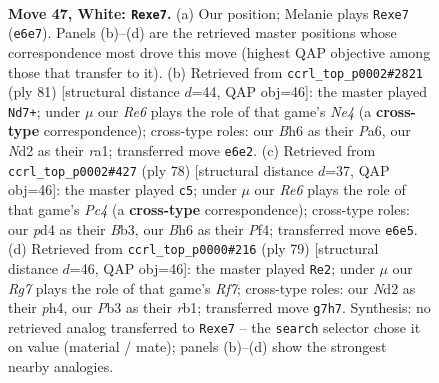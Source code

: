 \documentclass[11pt]{article}
\begin{document}
\clearpage

\begin{figure}[p]\centering
\begin{subfigure}{0.46\textwidth}\centering
\resizebox{\linewidth}{!}{%
\newchessgame
\chessboard[
  setfen={5k2/4n1R1/4R2B/8/1p1p2P1/pP6/P1PN3K/8 w - - 1 47},
  showmover=false,
  pgfstyle=straightmove, color=movearrow, markmove={e6-e7}
]}
\caption{}
\end{subfigure}\hfill
\begin{subfigure}{0.46\textwidth}\centering
\resizebox{\linewidth}{!}{%
\newchessgame
\chessboard[
  setfen={8/4k3/p2r2p1/2K1np1p/1P1N4/4P1P1/7P/R7 b - - 1 41},
  showmover=false,
  pgfstyle=straightmove, color=movearrow, markmove={e5-d7}
]}
\caption{}
\end{subfigure}
\\[4pt]
\begin{subfigure}{0.46\textwidth}\centering
\resizebox{\linewidth}{!}{%
\newchessgame
\chessboard[
  setfen={1r6/p7/4pk2/4Rn1p/2P2Pp1/1B6/P5P1/6K1 w - - 2 40},
  showmover=false,
  pgfstyle=straightmove, color=movearrow, markmove={c4-c5}
]}
\caption{}
\end{subfigure}\hfill
\begin{subfigure}{0.46\textwidth}\centering
\resizebox{\linewidth}{!}{%
\newchessgame
\chessboard[
  setfen={8/1p6/1bp3k1/p7/P6P/2P3K1/1P3r1N/1R6 b - - 1 40},
  showmover=false,
  pgfstyle=straightmove, color=movearrow, markmove={f2-e2}
]}
\caption{}
\end{subfigure}
\caption{\textbf{Move 47, White: \texttt{Rexe7}.} (a) Our position; Melanie plays \texttt{Rexe7} (\texttt{e6e7}). Panels (b)--(d) are the retrieved master positions whose correspondence most drove this move (highest QAP objective among those that transfer to it). (b) Retrieved from \texttt{ccrl\_top\_p0002\#2821} (ply 81) [structural distance $d$=44, QAP obj=46]: the master played \texttt{Nd7+}; under $\mu$ our \emph{Re6} plays the role of that game's \emph{Ne4} (a \textbf{cross-type} correspondence); cross-type roles: our \emph{B}h6 as their \emph{P}a6, our \emph{N}d2 as their \emph{r}a1; transferred move \texttt{e6e2}. (c) Retrieved from \texttt{ccrl\_top\_p0002\#427} (ply 78) [structural distance $d$=37, QAP obj=46]: the master played \texttt{c5}; under $\mu$ our \emph{Re6} plays the role of that game's \emph{Pc4} (a \textbf{cross-type} correspondence); cross-type roles: our \emph{p}d4 as their \emph{B}b3, our \emph{B}h6 as their \emph{P}f4; transferred move \texttt{e6e5}. (d) Retrieved from \texttt{ccrl\_top\_p0000\#216} (ply 79) [structural distance $d$=46, QAP obj=46]: the master played \texttt{Re2}; under $\mu$ our \emph{Rg7} plays the role of that game's \emph{Rf7}; cross-type roles: our \emph{N}d2 as their \emph{p}h4, our \emph{P}b3 as their \emph{r}b1; transferred move \texttt{g7h7}. Synthesis: no retrieved analog transferred to \texttt{Rexe7} -- the \texttt{search} selector chose it on value (material / mate); panels (b)--(d) show the strongest nearby analogies.}
\label{fig:thought-m92}
\end{figure}
\end{document}
